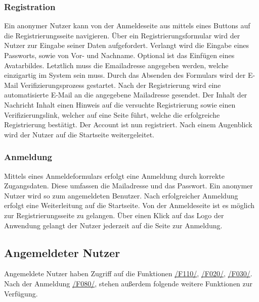 \subsubsection{Registration}
\begin{description}
     Ein anonymer Nutzer kann von der Anmeldeseite aus mittels eines
    Buttons auf die Registrierungsseite navigieren.
     Über ein Registrierungsformular wird der Nutzer zur Eingabe seiner
    Daten aufgefordert. Verlangt wird die Eingabe eines Passworts,
    sowie von Vor- und Nachname. Optional ist das Einfügen eines Avatarbildes. Letztlich muss die Emailadresse
    angegeben werden, welche einzigartig im System sein muss. Durch das Absenden des Formulars wird der E-Mail Verifizierungsprozess
    gestartet.
     Nach der Registrierung wird eine automatisierte E-Mail
    an die angegebene Mailadresse gesendet. Der Inhalt der Nachricht Inhalt einen Hinweis auf
    die versuchte Registrierung sowie einen Verifizierungslink, welcher auf eine Seite führt, welche
    die erfolgreiche Registrierung bestätigt. Der Account ist nun registriert. Nach einem Augenblick wird der Nutzer
    auf die Startseite weitergeleitet.
\end{description}

\subsubsection{Anmeldung}
\begin{description}
     Mittels eines Anmeldeformulars erfolgt eine Anmeldung durch korrekte Zugangsdaten.
    Diese umfassen die Mailadresse und das Passwort. Ein anonymer Nutzer wird so zum angemeldeten Benutzer.
    Nach erfolgreicher Anmeldung erfolgt eine Weiterleitung auf die Startseite.
     Von der Anmeldeseite ist es möglich zur Registrierungsseite zu gelangen.
     Über einen Klick auf das Logo der Anwendung gelangt der Nutzer jederzeit
    auf die Seite zur Anmeldung.
\end{description}

\subsection{Angemeldeter Nutzer}
Angemeldete Nutzer haben Zugriff auf die Funktionen
\hyperref[funkt:010]{/F110/}, \hyperref[funkt:020]{/F020/}, \hyperref[funkt:030]{/F030/}.
Nach der Anmeldung \hyperref[funkt:080]{/F080/},
stehen außerdem folgende weitere Funktionen zur Verfügung.

